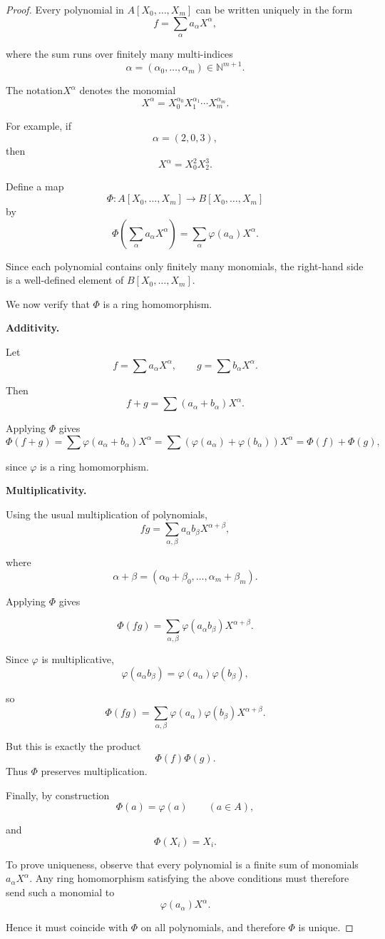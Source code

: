 \documentclass[oneside, a4paper, onecolumn, 11pt]{article}
\theoremstyle{definition}
\begin{document}
\begin{proof}

Every polynomial in $A[X_0,\dots,X_m]$ can be written uniquely in the form
\[f=\sum_{\alpha} a_\alpha X^\alpha,\]

where the sum runs over finitely many multi-indices \[\alpha=(\alpha_0,\dots,\alpha_m)\in\mathbb{N}^{m+1}.\]

The notation$ X^\alpha$ denotes the monomial \[X^\alpha=X_0^{\alpha_0}X_1^{\alpha_1}\cdots X_m^{\alpha_m}.\]

For example, if \[\alpha=(2,0,3), \]
then \[X^\alpha = X_0^2 X_2^3.\]

Define a map \[\Phi:A[X_0,\dots,X_m]\to B[X_0,\dots,X_m]\]
by \[\Phi\!\left(\sum_{\alpha} a_\alpha X^\alpha\right)=\sum_{\alpha} \varphi(a_\alpha) X^\alpha. \]

Since each polynomial contains only finitely many monomials, the right-hand
side is a well-defined element of $B[X_0,\dots,X_m]$.

We now verify that $\Phi$ is a ring homomorphism.

\textbf{Additivity.}

Let \[f=\sum a_\alpha X^\alpha,\qquad g=\sum b_\alpha X^\alpha.\]

Then \[f+g=\sum (a_\alpha+b_\alpha)X^\alpha.\]

Applying $\Phi$ gives \[\Phi(f+g)=\sum \varphi(a_\alpha+b_\alpha)X^\alpha=\sum (\varphi(a_\alpha)+\varphi(b_\alpha))X^\alpha=\Phi(f)+\Phi(g),\]

since $\varphi$ is a ring homomorphism.

\textbf{Multiplicativity.}

Using the usual multiplication of polynomials, \[fg=\sum_{\alpha,\beta} a_\alpha b_\beta X^{\alpha+\beta},\]

where \[\alpha+\beta=(\alpha_0+\beta_0,\dots,\alpha_m+\beta_m).\]

Applying $\Phi$ gives

\[\Phi(fg)=\sum_{\alpha,\beta}\varphi(a_\alpha b_\beta) X^{\alpha+\beta}.\]

Since $\varphi$ is multiplicative, \[\varphi(a_\alpha b_\beta)=\varphi(a_\alpha)\varphi(b_\beta),\]

so \[\Phi(fg)=\sum_{\alpha,\beta}\varphi(a_\alpha)\varphi(b_\beta) X^{\alpha+\beta}. \]

But this is exactly the product \[\Phi(f)\Phi(g).\]
Thus $\Phi$ preserves multiplication.

Finally, by construction \[\Phi(a)=\varphi(a)\qquad (a\in A), \]

and \[\Phi(X_i)=X_i.\]

To prove uniqueness, observe that every polynomial is a finite sum of
monomials $a_\alpha X^\alpha$. Any ring homomorphism satisfying the above
conditions must therefore send such a monomial to \[\varphi(a_\alpha)X^\alpha. \]

Hence it must coincide with $\Phi$ on all polynomials, and therefore $\Phi$
is unique.

\end{proof}
\end{document}
